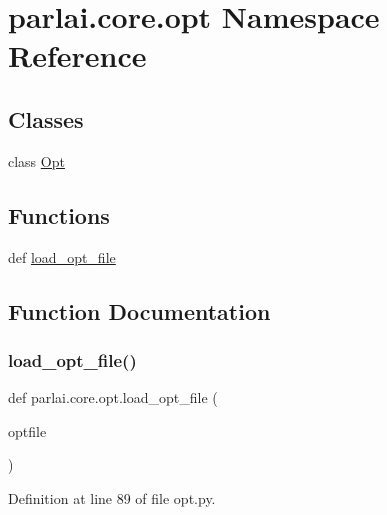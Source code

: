 \hypertarget{namespaceparlai_1_1core_1_1opt}{}\section{parlai.\+core.\+opt Namespace Reference}
\label{namespaceparlai_1_1core_1_1opt}
\subsection*{Classes}
\begin{DoxyCompactItemize}
\item 
class \hyperlink{classparlai_1_1core_1_1opt_1_1Opt}{Opt}
\end{DoxyCompactItemize}
\subsection*{Functions}
\begin{DoxyCompactItemize}
\item 
def \hyperlink{namespaceparlai_1_1core_1_1opt_a37f4d5498e9174737b7dab37a786c04f}{load\+\_\+opt\+\_\+file}
\end{DoxyCompactItemize}


\subsection{Function Documentation}
\mbox{\label{namespaceparlai_1_1core_1_1opt_a37f4d5498e9174737b7dab37a786c04f}} 
\subsubsection{\texorpdfstring{load\+\_\+opt\+\_\+file()}{load\_opt\_file()}}
{\footnotesize\ttfamily def parlai.\+core.\+opt.\+load\+\_\+opt\+\_\+file (\begin{DoxyParamCaption}\item[{}]{optfile }\end{DoxyParamCaption})}



Definition at line 89 of file opt.\+py.


